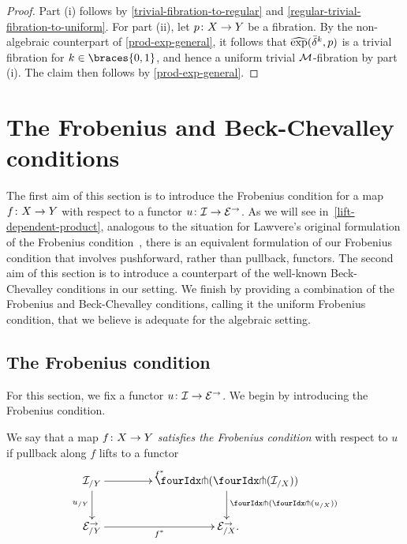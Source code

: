 \documentclass[reqno,10pt,a4paper,oneside,draft]{amsart}
\begin{document}
\begin{proof}
Part (i) follows by \cref{trivial-fibration-to-regular} and \cref{regular-trivial-fibration-to-uniform}.
For part (ii), let $p \co X \to Y$ be a fibration.
By the non-algebraic counterpart of \cref{prod-exp-general}, it follows that $\hatexp(\bar{\delta}^k, p)$ is a trivial fibration for $k \in \braces{0, 1}$, and hence a uniform trivial $\cal{M}$-fibration by part (i).
The claim then follows by \cref{prod-exp-general}.
\end{proof}


\section{The Frobenius and Beck-Chevalley conditions}
\label{sec:frobc}

The first aim of this section is to introduce the Frobenius condition for a map $f \co X \to Y$ with respect to a functor $u \co \cal{I} \to \catE^\to$.
As we will see in~\cref{lift-dependent-product}, analogous to the situation for Lawvere's original formulation of the Frobenius condition~\cite{lawvere-equality}, there is an equivalent formulation of our Frobenius condition that involves pushforward, rather than pullback, functors.
The second aim of this section is to introduce a counterpart of the well-known Beck-Chevalley conditions in our setting.
We finish by providing a combination of the Frobenius and Beck-Chevalley conditions, calling it the uniform Frobenius condition, that we believe is adequate for the algebraic setting.

\subsection*{The Frobenius condition}

For this section, we fix a functor $u \co \cal{I} \to \catE^\to$.
We begin by introducing the Frobenius condition.

\begin{definition} \label{thm:frobenius-def}
We say that a map $f \co X \to Y$ \emph{satisfies the Frobenius condition} with respect to $u$ if pullback along $f$ lifts to a functor
\[
\xymatrix@C=1.5cm{
  \cal{I}_{/Y}
  \ar[r]^{f^*}
  \ar[d]_{u_{/Y}}
&
  \liftl{(\liftr{(\cal{I}_{/X})})}
  \ar[d]^{\liftl{(\liftr{(u_{/X})})}}
\\
  \catE_{/Y}^\to \ar[r]_{f^*}
&
  \catE_{/X}^\to
\rlap{.}}
\]
\end{definition}
\end{document}
